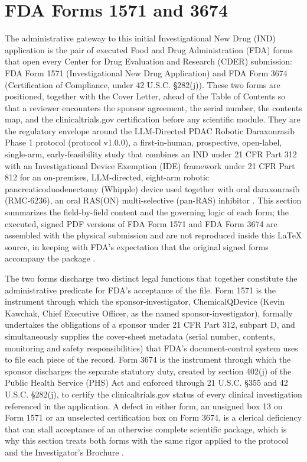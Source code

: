 \section{FDA Forms 1571 and 3674}

The administrative gateway to this initial Investigational New Drug
(IND) application is the pair of executed Food and Drug Administration
(FDA) forms that open every Center for Drug Evaluation and Research (CDER)
submission: FDA Form 1571 (Investigational New Drug Application) and FDA
Form 3674 (Certification of Compliance, under 42 U.S.C. \S 282(j)). These
two forms are positioned, together with the Cover Letter, ahead of the
Table of Contents so that a reviewer encounters the sponsor agreement, the
serial number, the contents map, and the clinicaltrials.gov certification
before any scientific module. They are the regulatory envelope around the
LLM-Directed PDAC Robotic Daraxonrasib Phase 1 protocol (protocol
v1.0.0), a first-in-human, prospective, open-label, single-arm,
early-feasibility study that combines an IND under 21 CFR Part 312 with an
Investigational Device Exemption (IDE) framework under 21 CFR Part 812 for
an on-premises, LLM-directed, eight-arm robotic pancreaticoduodenectomy
(Whipple) device used together with oral daraxonrasib (RMC-6236), an oral
RAS(ON) multi-selective (pan-RAS) inhibitor \cite{daraxwhipple,
onpremwhippl}. This section summarizes the field-by-field content and the
governing logic of each form; the executed, signed PDF versions of FDA
Form 1571 and FDA Form 3674 are assembled with the physical submission and
are not reproduced inside this LaTeX source, in keeping with FDA's
expectation that the original signed forms accompany the package
\cite{phase1guidance, cfr312paiuni}.

The two forms discharge two distinct legal functions that together
constitute the administrative predicate for FDA's acceptance of the file.
Form 1571 is the instrument through which the sponsor-investigator,
ChemicalQDevice (Kevin Kawchak, Chief Executive Officer, as the named
sponsor-investigator), formally undertakes the obligations of a sponsor
under 21 CFR Part 312, subpart D, and simultaneously supplies the
cover-sheet metadata (serial number, contents, monitoring and safety
responsibilities) that FDA's document-control system uses to file each
piece of the record. Form 3674 is the instrument through which the
sponsor discharges the separate statutory duty, created by section 402(j)
of the Public Health Service (PHS) Act and enforced through 21 U.S.C.
\S 355 and 42 U.S.C. \S 282(j), to certify the clinicaltrials.gov status
of every clinical investigation referenced in the application. A defect
in either form, an unsigned box 13 on Form 1571 or an unselected
certification box on Form 3674, is a clerical deficiency that can stall
acceptance of an otherwise complete scientific package, which is why this
section treats both forms with the same rigor applied to the protocol and
the Investigator's Brochure \cite{phase1guidance, paisitedocpk}.

